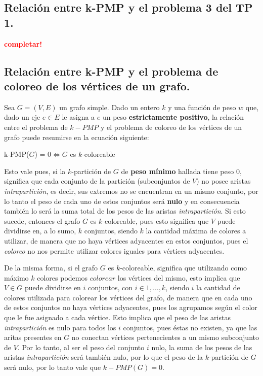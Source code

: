 \subsection{Relación entre k-PMP y el problema 3 del TP 1.}
\vspace*{0.3cm}
\textcolor{red}{\textbf{completar!}}



\newpage
\subsection{Relación entre k-PMP y el problema de coloreo de los vértices de
            un grafo.}
\vspace*{0.3cm}

Sea $G = (V, E)$ un grafo simple. Dado un entero $k$ y una función de peso $w$ 
que, dado un eje $e \in E$ le asigna a $e$ un peso \textbf{estrictamente positivo},
la relación entre el problema de $k-PMP$ y el problema de coloreo de los vértices 
de un grafo puede resumirse en la ecuación siguiente:

\begin{center}
  k-PMP($G$) = $0 \iff G$ es $k$-coloreable
\end{center}

Esto vale pues, si la $k$-partición de $G$ de \textbf{peso mínimo} hallada 
tiene peso $0$, significa que cada conjunto de la partición (subconjuntos de $V$) 
no posee aristas \textit{intrapartición}, es decir, sus extremos no se encuentran en 
un mismo conjunto, por lo tanto el peso de cada uno de estos conjuntos será 
\textbf{nulo} y en consecuencia también lo será la suma total de los pesos de 
las aristas \textit{intrapartición}. Si esto sucede, entonces el grafo $G$ es 
$k$-coloreable, pues esto significa que $V$ puede dividirse en, a lo sumo, $k$ 
conjuntos, siendo $k$ la cantidad máxima de colores a utilizar, de manera que no 
haya vértices adyacentes en estos conjuntos, pues el \textit{coloreo} no nos permite 
utilizar colores iguales para vértices adyacentes.

De la misma forma, si el grafo $G$ es $k$-coloreable, significa que utilizando 
como máximo $k$ colores podemos $colorear$ los vértices del mismo, esto implica 
que $V \in G$ puede dividirse en $i$ conjuntos, con $i \in {1, \dots, k}$, siendo $i$ 
la cantidad de colores utilizada para colorear los vértices del grafo, de manera 
que en cada uno de estos conjuntos no haya vértices adyacentes, pues los agrupamos 
según el color que le fue asignado a cada vértice. Esto implica que el peso de 
las aristas \textit{intrapartición} es nulo para todos los $i$ conjuntos, pues éstas no 
existen, ya que las aritas presentes en $G$ no conectan vértices pertenecientes a 
un mismo subconjunto de $V$. Por lo tanto, al ser el peso del conjunto $i$ nulo, 
la suma de los pesos de las aristas \textit{intrapartición} será también nulo, por lo 
que el peso de la $k$-partición de $G$ será nulo, por lo tanto vale que $k-PMP(G) = 0$.

